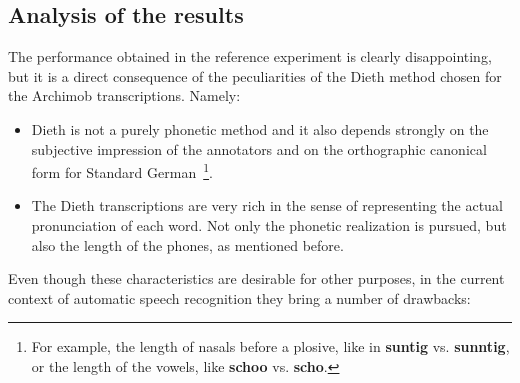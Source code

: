 \documentclass[11pt,a4paper,titlepage,twoside]{article}
\begin{document}
\subsection{Analysis of the results}
\label{sec:analysis-results}

The performance obtained in the reference experiment is clearly disappointing, but it is a direct consequence of the peculiarities of the Dieth method chosen for the Archimob transcriptions. Namely:

\begin{itemize}
  \item Dieth is not a purely phonetic method and it also depends strongly on the subjective impression of the annotators and on the orthographic canonical form for Standard German~\footnote{For example, the length of nasals before a plosive, like in \textbf{suntig} vs. \textbf{sunntig}, or the length of the vowels, like \textbf{schoo} vs. \textbf{scho}.}.
  \item The Dieth transcriptions are very rich in the sense of representing the actual pronunciation of each word. Not only the phonetic realization is pursued, but also the length of the phones, as mentioned before.
\end{itemize}

Even though these characteristics are desirable for other purposes, in the current context of automatic speech recognition they bring a number of drawbacks:
\end{document}
